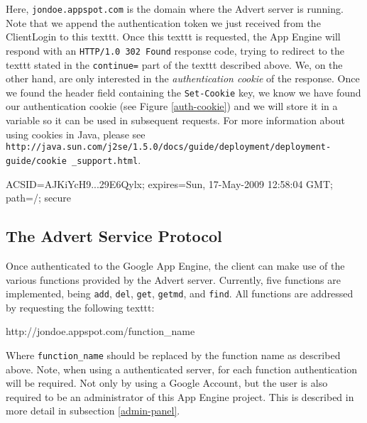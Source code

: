 Here, \texttt{jondoe.appspot.com} is the domain where the Advert server is
running. Note that we append the authentication token we just received from the
ClientLogin to this texttt. Once this texttt is requested, the App Engine will
respond with an \texttt{HTTP/1.0 302 Found} response code, trying to redirect
to the texttt stated in the \texttt{continue=} part of the texttt described above.
We, on the other hand, are only interested in the \emph{authentication cookie}
of the response. Once we found the header field containing the
\texttt{Set-Cookie} key, we know we have found our authentication cookie (see
Figure \ref{auth-cookie}) and we will store it in a variable so it can be used
in subsequent requests. For more information about using cookies in Java,
please see
\texttt{
http://java.sun.com/j2se/1.5.0/docs/guide/deployment/deployment-guide/cookie
\_support.html}.

\begin{figure*}[ht] %
\begin{center}
\begin{code}
ACSID=AJKiYcH9...29E6Qylx; expires=Sun, 17-May-2009 12:58:04 GMT;
    path=/; secure
\end{code}
\caption{Authentication Cookie.\label{auth-cookie}}
\end{center}
\end{figure*}

\subsection{The Advert Service Protocol}
\label{protocol}
Once authenticated to the Google App Engine, the client can make use of the
various functions provided by the Advert server. Currently, five functions are
implemented, being \texttt{add}, \texttt{del}, \texttt{get}, \texttt{getmd},
and \texttt{find}. All functions are addressed by requesting the following texttt:

\begin{center}
\begin{code}
http://jondoe.appspot.com/function_name
\end{code}
\end{center}

Where \texttt{function\_name} should be replaced by the function name as
described above. Note, when using a authenticated server, for each function
authentication will be required. Not only by using a Google Account, but
the user is also required to be an administrator of this App Engine project.
This
is described in more detail in subsection \ref{admin-panel}.

